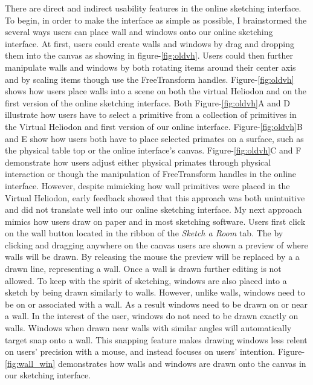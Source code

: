 		There are direct and indirect usability features in the online sketching interface.
		To begin, in order to make the interface as simple as possible, I brainstormed the several ways users can place wall and windows onto our online sketching interface.
		At first, users could create walls and windows by drag and dropping them into the canvas as showing in figure-\ref{fig:oldvh}.
		Users could then further manipulate walls and windows by both rotating items around their center axis and by scaling items though use the FreeTransform handles. 
		Figure-\ref{fig:oldvh} shows how users place walls into a scene on both the virtual Heliodon and on the first version of the online sketching interface.
		Both Figure-\ref{fig:oldvh}A and D illustrate how users have to select a primitive from a collection of primitives in the Virtual Heliodon and first version of our online interface.
		Figure-\ref{fig:oldvh}B and E show how users both have to place selected primates on a surface, such as the physical table top or the online interface's canvas.
		Figure-\ref{fig:oldvh}C and F demonstrate how users adjust either physical primates through physical interaction or though the manipulation of FreeTransform handles in the online interface.
		However, despite mimicking how wall primitives were placed in the Virtual Heliodon, early feedback showed that this approach was both unintuitive and did not translate well into our online sketching interface.
		My next approach mimics how users draw on paper and in most sketching software.
		Users first click on the wall button located in the ribbon of the \textit{Sketch a Room} tab.
		The by clicking and dragging anywhere on the canvas users are shown a preview of where walls will be drawn.
		By releasing the mouse the preview will be replaced by a a drawn line, representing a wall.
		Once a wall is drawn further editing is not allowed.
		To keep with the spirit of sketching, windows are also placed into a sketch by being drawn similarly to walls.
		However, unlike walls, windows need to be on or associated with a wall.
		As a result windows need to be drawn on or near a wall.
		In the interest of the user, windows do not need to be drawn exactly on walls.
		Windows when drawn near walls with similar angles will automatically target snap onto a wall.
		This snapping feature makes drawing windows less relent on users' precision with a mouse, and instead focuses on users' intention.
		Figure-\ref{fig:wall_win} demonstrates how walls and windows are drawn onto the canvas in our sketching interface.


